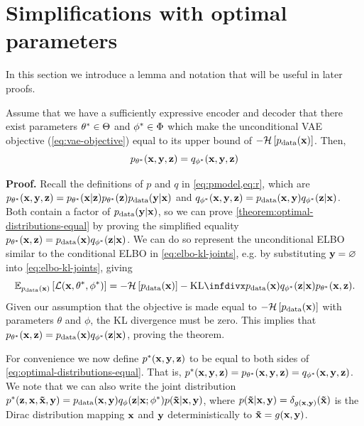 \section{Simplifications with optimal parameters}

In this section we introduce a lemma and notation that will be useful in later proofs.

\begin{theorem} \label{theorem:optimal-distributions-equal}
    Assume that we have a sufficiently expressive
  encoder and decoder that there exist parameters ${\theta}^*\in\Theta$
  and ${\phi}^*\in\Phi$ which make the unconditional VAE objective
  (\cref{eq:vae-objective}) equal to its upper bound of $-\mathcal{H}\left[ p_{\rm{data}}({\mathbf{x}})
  \right]$. Then,
\begin{equation} \label{eq:optimal-distributions-equal}
  p_{{\theta}^*}({\mathbf{x}},{\mathbf{y}},{\mathbf{z}}) = q_{{\phi}^*}({\mathbf{x}},{\mathbf{y}},{\mathbf{z}})
\end{equation}
\end{theorem}

\textbf{Proof.} Recall the definitions of $p$ and $q$ in \cref{eq:pmodel,eq:r}, which are $p_{{\theta}^*}({\mathbf{x}},{\mathbf{y}},{\mathbf{z}}) = p_{{\theta}^*}({\mathbf{x}}|{\mathbf{z}})p_{{\theta}^*}({\mathbf{z}})p_{\rm{data}}({\mathbf{y}}|{\mathbf{x}})$ and $q_{{\phi}^*}({\mathbf{x}},{\mathbf{y}},{\mathbf{z}}) = p_{\rm{data}}({\mathbf{x}},{\mathbf{y}})q_{{\phi}^*}({\mathbf{z}}|{\mathbf{x}})$. Both contain a factor of $p_{\rm{data}}({\mathbf{y}}|{\mathbf{x}})$, so we can prove \cref{theorem:optimal-distributions-equal} by proving the simplified equality $p_{{\theta}^*}({\mathbf{x}},{\mathbf{z}}) = p_{\rm{data}}({\mathbf{x}}) q_{{\phi}^*}({\mathbf{z}}|{\mathbf{x}})$. We can do so represent the unconditional ELBO similar to the conditional ELBO in \cref{eq:elbo-kl-joints}, e.g. by substituting ${\mathbf{y}} = \varnothing$ into \cref{eq:elbo-kl-joints}, giving
\begin{equation}
    \EX_{\pdata(\rvx)} \left[ \gL(\rvx,\optimal{\theta},\optimal{\phi}) \right] =  - \gH \left[ \pdata(\rvx) \right] 
    - \kl{ \pdata(\rvx)q_{\optimal{\phi}}(\rvz|\rvx) 
    }{
    p_{\optimal{\theta}}(\rvx,\rvz) 
    }.
\end{equation}
Given our assumption that the objective is made equal to $- {\mathcal{H}} \left[ p_{\rm{data}}({\mathbf{x}}) \right]$ with parameters $\theta$ and $\phi$, the KL divergence must be zero. This implies that $p_{{\theta}^*}({\mathbf{x}},{\mathbf{z}}) = p_{\rm{data}}({\mathbf{x}})q_{{\phi}^*}({\mathbf{z}}|{\mathbf{x}}) $, proving the theorem.

For convenience we now define ${p}^*({\mathbf{x}},{\mathbf{y}},{\mathbf{z}})$ to be equal to both sides of \cref{eq:optimal-distributions-equal}. That is, ${p}^*({\mathbf{x}},{\mathbf{y}},{\mathbf{z}}) = p_{{\theta}^*}({\mathbf{x}},{\mathbf{y}},{\mathbf{z}}) = q_{{\phi}^*}({\mathbf{x}},{\mathbf{y}},{\mathbf{z}})$. We note that we can also write the joint
distribution ${p}^*({\mathbf{z}}, {\mathbf{x}}, \mathbf{\tilde{x}}{}, {\mathbf{y}}) = p_{\rm{data}} ({\mathbf{x}},
{\mathbf{y}}) q_\phi({\mathbf{z}}|{\mathbf{x}}; {\phi}^*)p(\mathbf{\tilde{x}}{}|{\mathbf{x}},{\mathbf{y}})$, where
$p(\mathbf{\tilde{x}}{}|{\mathbf{x}},{\mathbf{y}})=\delta_{g({\mathbf{x}},{\mathbf{y}})}(\mathbf{\tilde{x}}{})$ is the Dirac
distribution mapping ${\mathbf{x}}$ and ${\mathbf{y}}$ deterministically to
$\mathbf{\tilde{x}}{}=g({\mathbf{x}},{\mathbf{y}})$.

